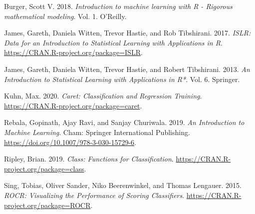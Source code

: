\documentclass[]{book}
\begin{document}
\hypertarget{refs}{}
\leavevmode\hypertarget{ref-Burger2018}{}%
Burger, Scott V. 2018. \emph{Introduction to machine learning with R - Rigorous mathematical modeling}. Vol. 1. O'Reilly.

\leavevmode\hypertarget{ref-R-ISLR}{}%
James, Gareth, Daniela Witten, Trevor Hastie, and Rob Tibshirani. 2017. \emph{ISLR: Data for an Introduction to Statistical Learning with Applications in R}. \url{https://CRAN.R-project.org/package=ISLR}.

\leavevmode\hypertarget{ref-james2013introduction}{}%
James, Gareth, Daniela Witten, Trevor Hastie, and Robert Tibshirani. 2013. \emph{An Introduction to Statistical Learning with Applications in R*}. Vol. 6. Springer.

\leavevmode\hypertarget{ref-R-caret}{}%
Kuhn, Max. 2020. \emph{Caret: Classification and Regression Training}. \url{https://CRAN.R-project.org/package=caret}.

\leavevmode\hypertarget{ref-Rebala2019}{}%
Rebala, Gopinath, Ajay Ravi, and Sanjay Churiwala. 2019. \emph{An Introduction to Machine Learning}. Cham: Springer International Publishing. \url{https://doi.org/10.1007/978-3-030-15729-6}.

\leavevmode\hypertarget{ref-R-class}{}%
Ripley, Brian. 2019. \emph{Class: Functions for Classification}. \url{https://CRAN.R-project.org/package=class}.

\leavevmode\hypertarget{ref-R-ROCR}{}%
Sing, Tobias, Oliver Sander, Niko Beerenwinkel, and Thomas Lengauer. 2015. \emph{ROCR: Visualizing the Performance of Scoring Classifiers}. \url{https://CRAN.R-project.org/package=ROCR}.
\end{document}
